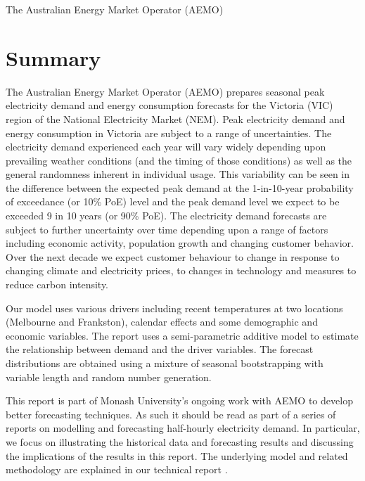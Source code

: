 \documentclass[11pt]{article}
\begin{document}
      {\SF\RH}
      {The Australian Energy Market Operator (AEMO)}

\tableofcontents

\newpage{}


\section*{Summary}

The Australian Energy Market Operator (AEMO) prepares seasonal peak electricity demand and energy consumption forecasts for the Victoria (VIC) region of the National Electricity Market (NEM)\@. Peak electricity demand and energy consumption in Victoria are subject to a range of uncertainties. The electricity demand experienced each year will vary widely depending upon prevailing weather conditions (and the timing of those conditions) as well as the general randomness inherent in individual usage. This variability can be seen in the difference between the expected peak demand at the 1-in-10-year probability of exceedance (or 10\% PoE) level and the peak demand level we expect to be exceeded 9 in 10 years (or 90\% PoE). The electricity demand forecasts are subject to further uncertainty over time depending upon a range of factors including economic activity, population growth and changing customer behavior. Over the next decade we expect customer behaviour to change in response to changing climate and electricity prices, to changes in technology and measures to reduce carbon intensity.

Our model uses various drivers including recent temperatures at two locations (Melbourne and Frankston), calendar effects and some demographic and economic variables. The report uses a semi-parametric additive model to estimate the relationship between demand and the driver variables. The forecast distributions are obtained using a mixture of seasonal bootstrapping with variable length and random number generation.

This report is part of Monash University's ongoing work with AEMO to develop better forecasting techniques.  As such it should be read as part of a series of reports on modelling and forecasting half-hourly electricity demand. In particular, we focus on illustrating the historical data and forecasting results and discussing the implications of the results in this report. The underlying model and related methodology are explained in our technical report \citep{Tech15}.
\end{document}

